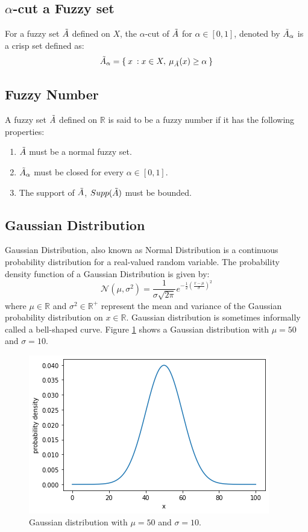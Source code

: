 \documentclass{article}
\begin{document}
\subsection{$\alpha$-cut a Fuzzy set}
For a fuzzy set $\Tilde{A}$ defined on $X$, the $\alpha$-cut of $\Tilde{A}$ for $\alpha \in [0,1]$, denoted by $\Tilde{A}_\alpha$ is a crisp set defined as:
\begin{equation}
    \Tilde{A}_{\alpha} = \{ \: x \: : x\in{X}, \: \mu_{\Tilde{A}}(x) \geq \alpha \: \}
\end{equation}

\subsection{Fuzzy Number}
A fuzzy set $\Tilde{A}$ defined on $\mathbb{R}$ is said to be a fuzzy number if it has the following properties:
\begin{enumerate}
    \item $\Tilde{A}$ must be a normal fuzzy set.
    \item $\Tilde{A}_\alpha$ must be closed for every $\alpha \in [0,1]$.
    \item The support of $\Tilde{A}$, $Supp(\Tilde{A})$ must be bounded.
\end{enumerate}

\subsection{Gaussian Distribution}
Gaussian Distribution, also known as Normal Distribution is a continuous probability distribution for a real-valued random variable. The probability density function of a Gaussian Distribution is given by:
\begin{equation}
    \mathcal{N}(\mu , \sigma{^2}) = \frac{1}{\sigma \sqrt{2\pi}}e^{-\frac{1}{2}(\frac{x-\mu}{\sigma})^2}
\end{equation}
where $\mu \in \mathbb{R}$ and $\sigma{^2}\in\mathbb{R}^{+}$ represent the mean and variance of the Gaussian probability distribution on $x\in\mathbb{R}$. Gaussian distribution is sometimes informally called a bell-shaped curve. Figure \ref{fig:gauss} shows a Gaussian distribution with $\mu = 50$ and $\sigma = 10$.

\begin{figure}
    \centering
    \includegraphics[scale=0.5]{gaussian_dist.png}
    \caption{\label{fig:gauss} Gaussian distribution with $\mu = 50$ and $\sigma = 10$. }
    \label{fig:gauss}
\end{figure}
\end{document}
